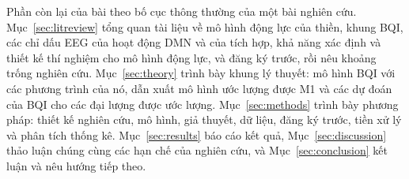 Phần còn lại của bài theo bố cục thông thường của một bài nghiên cứu. Mục~\ref{sec:litreview} tổng quan tài liệu về mô hình động lực của thiền, khung BQI, các chỉ dấu EEG của hoạt động DMN và của tích hợp, khả năng xác định và thiết kế thí nghiệm cho mô hình động lực, và đăng ký trước, rồi nêu khoảng trống nghiên cứu. Mục~\ref{sec:theory} trình bày khung lý thuyết: mô hình BQI với các phương trình của nó, dẫn xuất mô hình ước lượng được M1 và các dự đoán của BQI cho các đại lượng được ước lượng. Mục~\ref{sec:methods} trình bày phương pháp: thiết kế nghiên cứu, mô hình, giả thuyết, dữ liệu, đăng ký trước, tiền xử lý và phân tích thống kê. Mục~\ref{sec:results} báo cáo kết quả, Mục~\ref{sec:discussion} thảo luận chúng cùng các hạn chế của nghiên cứu, và Mục~\ref{sec:conclusion} kết luận và nêu hướng tiếp theo.
